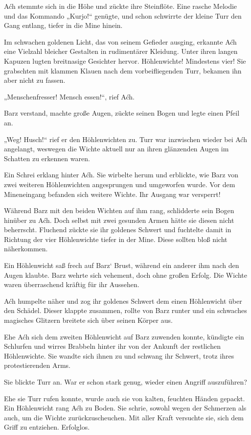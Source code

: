 Aćh stemmte sich in die Höhe und zückte ihre Steinflöte. Eine rasche Melodie und das Kommando „Kurjo!“ genügte, und schon schwirrte der kleine Turr den Gang entlang, tiefer in die Mine hinein.

Im schwachen goldenen Licht, das von seinem Gefieder ausging, erkannte Aćh eine Vielzahl bleicher Gestalten in rudimentärer Kleidung. Unter ihren langen Kapuzen lugten breitnasige Gesichter hervor. Höhlenwichte! Mindestens vier! Sie grabschten mit klammen Klauen nach dem vorbeifliegenden Turr, bekamen ihn aber nicht zu fassen.

„Menschenfresser! Mensch essen!“, rief Aćh.

Barz verstand, machte große Augen, zückte seinen Bogen und legte einen Pfeil an.

„Weg! Husch!“ rief er den Höhlenwichten zu. Turr war inzwischen wieder bei Aćh angelangt, weswegen die Wichte aktuell nur an ihren glänzenden Augen im Schatten zu erkennen waren.

Ein Schrei erklang hinter Aćh. Sie wirbelte herum und erblickte, wie Barz von zwei weiteren Höhlenwichten angesprungen und umgeworfen wurde. Vor dem Mineneingang befanden sich weitere Wichte. Ihr Ausgang war versperrt!

Während Barz mit den beiden Wichten auf ihm rang, schlidderte sein Bogen hinüber zu Aćh. Doch selbst mit zwei gesunden Armen hätte sie diesen nicht beherrscht. Fluchend zückte sie ihr goldenes Schwert und fuchtelte damit in Richtung der vier Höhlenwichte tiefer in der Mine. Diese sollten bloß nicht näherkommen.

Ein Höhlenwicht saß frech auf Barz‘ Brust, während ein anderer ihm nach den Augen klaubte. Barz wehrte sich vehement, doch ohne großen Erfolg. Die Wichte waren überraschend kräftig für ihr Aussehen.

Aćh humpelte näher und zog ihr goldenes Schwert dem einen Höhlenwicht über den Schädel. Dieser klappte zusammen, rollte von Barz runter und ein schwaches magisches Glitzern breitete sich über seinen Körper aus.

Ehe Aćh sich dem zweiten Höhlenwicht auf Barz zuwenden konnte, kündigte ein Schlurfen und wirres Brabbeln hinter ihr von der Ankunft der restlichen Höhlenwichte. Sie wandte sich ihnen zu und schwang ihr Schwert, trotz ihres protestierenden Arms.

Sie blickte Turr an. War er schon stark genug, wieder einen Angriff auszuführen?

Ehe sie Turr rufen konnte, wurde auch sie von kalten, feuchten Händen gepackt. Ein Höhlenwicht rang Aćh zu Boden. Sie schrie, sowohl wegen der Schmerzen als auch, um die Wichte zurückzuscheuchen. Mit aller Kraft versuchte sie, sich dem Griff zu entziehen. Erfolglos.

